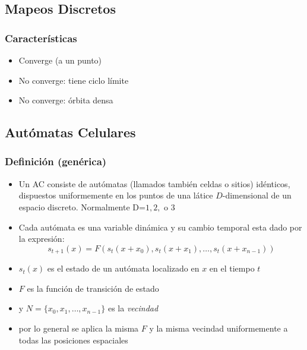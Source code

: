 \documentclass{beamer}
\begin{document}
\subsection{Mapeos Discretos}
\frame
{
  \frametitle{Características}

  \begin{itemize}[<+->]
  \item Converge (a un punto)
  \item No converge: tiene ciclo límite
  \item No converge: órbita densa
  \end{itemize}
}

\subsection{Autómatas Celulares}

\begin{frame}[t]
  \frametitle{Definición (genérica)}
  \begin{itemize}[<+->]
  \item Un AC consiste de autómatas (llamados también celdas o sitios) idénticos, dispuestos uniformemente en los puntos de una látice $D$-dimensional de un espacio discreto. Normalmente D=$1, 2,$ o $3$
  \item Cada autómata es una variable dinámica y su cambio temporal esta dado por la expresión:
  $$s_{t+1}(x) = F (s_{t}(x + x_{0}), s_{t}(x + x_{1}),\ldots , s_{t}(x + x_{n-1}))$$
  \item $s_{t}(x)$ es el estado de un autómata localizado en $x$ en el tiempo $t$
  \item $F$ es la función de transición de estado
  \item y $N=\{x_{0}, x_{1}, \ldots, x_{n-1}\}$ es la \textit{vecindad}
  \item por lo general se aplica la misma $F$ y la misma vecindad uniformemente a todas las posiciones espaciales
  \end{itemize}
\end{frame}
\end{document}
